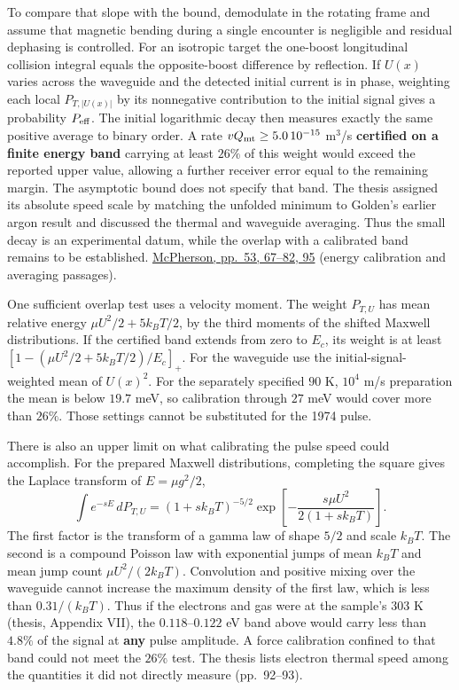 \documentclass[11pt,a4paper]{article}
\begin{document}
To compare that slope with the bound, demodulate in the rotating frame
and assume that magnetic bending during a single encounter is negligible
and residual dephasing is controlled. For an isotropic target the
one-boost longitudinal collision integral equals the opposite-boost
difference by reflection. If \(U(x)\) varies across the waveguide and
the detected initial current is in phase, weighting each local
\(P_{T,|U(x)|}\) by its nonnegative contribution to the initial signal
gives a probability \(P_{\rm eff}\). The initial logarithmic decay then
measures exactly the same positive average to binary order. A rate
\(vQ_{\rm mt}\ge5.0\,10^{-15}\) m\(^3\)/s \textbf{certified on a finite
energy band} carrying at least \(26\%\) of this weight would exceed the
reported upper value, allowing a further receiver error equal to the
remaining margin. The asymptotic bound does not specify that band. The
thesis assigned its absolute speed scale by matching the unfolded
minimum to Golden's earlier argon result and discussed the thermal and
waveguide averaging. Thus the small decay is an experimental datum,
while the overlap with a calibrated band remains to be established.
\href{https://repository.gatech.edu/bitstreams/b6e6ee45-e4b3-49d9-b1a8-492a589e7bee/download}{McPherson,
pp.~53, 67--82, 95} (energy calibration and averaging passages).

One sufficient overlap test uses a velocity moment. The weight
\(P_{T,U}\) has mean relative energy \(\mu U^2/2+5k_BT/2\), by the third
moments of the shifted Maxwell distributions. If the certified band
extends from zero to \(E_c\), its weight is at least
\([1-(\mu U^2/2+5k_BT/2)/E_c]_+\). For the waveguide use the
initial-signal-weighted mean of \(U(x)^2\). For the separately specified
\(90\) K, \(10^4\) m/s preparation the mean is below \(19.7\) meV, so
calibration through \(27\) meV would cover more than \(26\%\). Those
settings cannot be substituted for the 1974 pulse.

There is also an upper limit on what calibrating the pulse speed could
accomplish. For the prepared Maxwell distributions, completing the
square gives the Laplace transform of \(E=\mu g^2/2\), \[
 \int e^{-sE}\,dP_{T,U}
 =(1+s k_BT)^{-5/2}
 \exp\!\left[-\frac{s\mu U^2}{2(1+s k_BT)}\right].
\] The first factor is the transform of a gamma law of shape \(5/2\) and
scale \(k_BT\). The second is a compound Poisson law with exponential
jumps of mean \(k_BT\) and mean jump count \(\mu U^2/(2k_BT)\).
Convolution and positive mixing over the waveguide cannot increase the
maximum density of the first law, which is less than \(0.31/(k_BT)\).
Thus if the electrons and gas were at the sample's \(303\) K (thesis,
Appendix VII), the \(0.118\)--\(0.122\) eV band above would carry less
than \(4.8\%\) of the signal at \textbf{any} pulse amplitude. A force
calibration confined to that band could not meet the \(26\%\) test. The
thesis lists electron thermal speed among the quantities it did not
directly measure (pp.~92--93).
\end{document}
